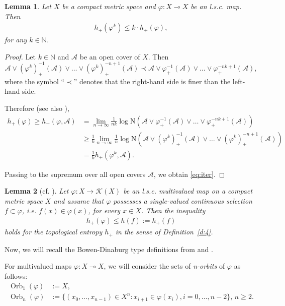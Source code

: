\documentclass[12pt]{amsart}
\newtheorem{lemma}{Lemma}
\theoremstyle{definition}
\newcommand{\K}{\mathcal{K}}
\newcommand\N{\mathbb{N}}
\newcommand{\NN}{{\mathrm{N}}}
\newcommand{\vp}{\varphi}
\newcommand{\A}{{\mathcal{A}}}
\newcommand{\orbn}{{\operatorname{Orb}_n}}
\newcommand\orb[1]{{\operatorname{Orb}_{#1}}}
\begin{document}
\begin{lemma}\label{l:iter}
Let $X$ be a compact metric space and $\vp:X\multimap X$ be an l.s.c. map. Then
\begin{align}\label{eq:iter}
h_{+}(\vp^k) \leq k\cdot h_{+}(\vp),
\end{align}
for any $k\in\N$.
\end{lemma}
\begin{proof}
Let $k\in\N$ and $\A$ be an open cover of $X$. Then
\[
\A\vee (\vp^k)^{-1}_{+}(\A) \vee \ldots \vee (\vp^{k})^{-n+1}_{+}(\A) \prec \A\vee \vp^{-1}_{+}(\A) \vee \ldots \vee \vp^{-nk+1}_{+}(\A),
\]
where the symbol ``$\prec$'' denotes that the right-hand side is finer than the left-hand side.

Therefore (see also \cite[Lemma 3]{AL2}),
\begin{align*}
h_{+}(\vp) \geq h_{+}(\vp,\A) &= \lim_{n\to\infty} \frac1{nk} \log \NN(\A\vee \vp^{-1}_{+}(\A) \vee \ldots \vee \vp^{-nk+1}_{+}(\A))\\
&\geq \frac1{k} \lim_{n\to\infty} \frac1{n} \log \NN(\A\vee (\vp^k)^{-1}_{+}(\A) \vee \ldots \vee (\vp^{k})^{-n+1}_{+}(\A))\\
&= \frac1{k} h_{+}(\vp^k,\A).
\end{align*}

Passing to the supremum over all open covers $\A$, we obtain \eqref{eq:iter}.

\end{proof}

\begin{lemma}[cf. {\cite[Proposition 7]{AL1}}]\label{l:2}
Let $\vp:X\to\K(X)$ be an l.s.c. multivalued map on a compact metric space $X$ and assume that $\vp$ possesses a single-valued continuous selection $f\subset\vp$, i.e. $f(x)\in\vp(x)$, for every $x\in X$. Then the inequality 
\begin{align}\label{eq:A1}
h_+(\vp)\leq h(f):=h_+(f)
\end{align}
holds for the topological entropy $h_+$ in the sense of Definition~\ref{d:4}.
\end{lemma}

Now, we will recall the Bowen-Dinaburg type definitions from \cite{KT} and \cite{CMM1}.

For multivalued maps $\vp:X\multimap X$, we will consider the sets of \emph{n-orbits} of $\vp$ as follows:
\begin{align*}
\orb{1}(\vp)&:=X,\\
\orbn(\vp) &:= \{(x_0,\ldots, x_{n-1})\in X^{n}: x_{i+1} \in \vp(x_i), i=0,\ldots, n-2\},\, n\geq 2.
\end{align*}
\end{document}
